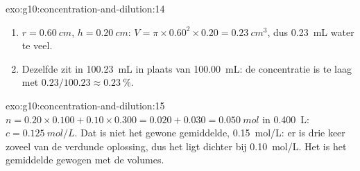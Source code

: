 \begin{solution}{exo:g10:concentration-and-dilution:14}
\begin{enumerate}
  \item $r = \qty{0.60}{cm}$, $h = \qty{0.20}{cm}$:
        $V = \pi \times 0.60^2 \times 0.20 = \qty{0.23}{cm^3}$, dus
        \qty{0.23}{mL} water te veel.
  \item Dezelfde  zit in \qty{100.23}{mL} in plaats van
        \qty{100.00}{mL}: de concentratie is te laag met $0.23 / 100.23 \approx
        \qty{0.23}{\percent}$.
\end{enumerate}
\end{solution}

\begin{solution}{exo:g10:concentration-and-dilution:15}
$n = 0.20 \times 0.100 + 0.10 \times 0.300 = 0.020 + 0.030 =
\qty{0.050}{mol}$ in \qty{0.400}{L}: $c = \qty{0.125}{mol/L}$. Dat is
niet het gewone gemiddelde, \qty{0.15}{mol/L}: er is drie keer zoveel van
de verdunde oplossing, dus het  ligt dichter bij
\qty{0.10}{mol/L}. Het is het gemiddelde gewogen met de volumes.
\end{solution}

